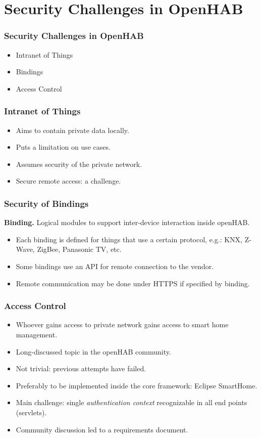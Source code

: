 \documentclass{beamer}
\begin{document}
\section{Security Challenges in OpenHAB}
\begin{frame}
\frametitle{Security Challenges in OpenHAB}
\begin{itemize}
  \setlength\itemsep{1.5em}
\item Intranet of Things
\item Bindings
\item Access Control
\end{itemize}
\end{frame}
\begin{frame}
\frametitle{Intranet of Things}
\begin{itemize}
  \setlength\itemsep{1.5em}
\item Aims to contain private data locally.
\item Puts a limitation on use cases.
\item Assumes security of the private network.
\item Secure remote access: a challenge.
\end{itemize}
\end{frame}
\begin{frame}
\frametitle{Security of Bindings}
\textbf{Binding.} Logical modules to support inter-device interaction inside openHAB.
\begin{itemize}
  \setlength\itemsep{1.5em}
\item Each binding is defined for things that use a certain protocol, e.g.: KNX, Z-Wave, ZigBee, Panasonic TV, etc.
\item Some bindings use an API for remote connection to the vendor.
\item Remote communication may be done under HTTPS if specified by binding.
\end{itemize}
\end{frame}
\begin{frame}
\frametitle{Access Control}
\begin{itemize}
  \setlength\itemsep{1.5em}
\item Whoever gains access to private network gains access to smart home management.
\item Long-discussed topic in the openHAB community.
\item Not trivial: previous attempts have failed.
\item Preferably to be implemented inside the core framework: Eclipse SmartHome.
\item Main challenge: single \emph{authentication context} recognizable in all end points (servlets).
\item Community discussion led to a requirements document.
\end{itemize}
\end{frame}
\end{document}
